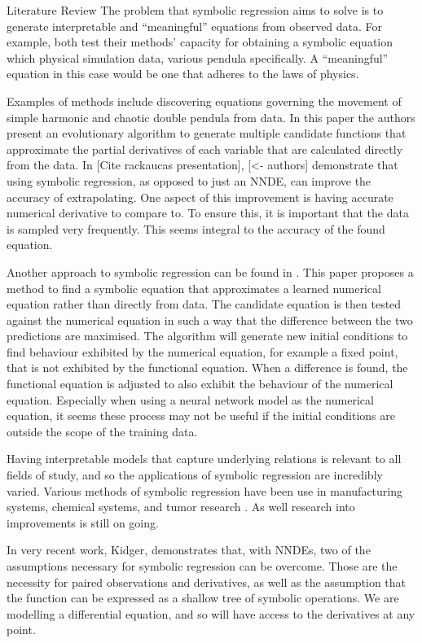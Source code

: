 \documentclass[12pt]{amsart}
\begin{document}
\begin{section}{Literature Review}
        The problem that symbolic regression aims to solve is to generate interpretable and ``meaningful'' equations from observed data. For example, both \cite{schmidt2009distilling,bongard2007automated} test their methods' capacity for obtaining a symbolic equation which physical simulation data, various pendula specifically. A ``meaningful'' equation in this case would be one that adheres to the laws of physics.


        Examples of methods include discovering equations governing the movement of simple harmonic and chaotic double pendula from data\cite{schmidt2009distilling}. In this paper the authors present an evolutionary algorithm to generate multiple candidate functions that approximate the partial derivatives of each variable that are calculated directly from the data. In [Cite rackaucas presentation], [<- authors] demonstrate that using symbolic regression, as opposed to just an NNDE, can improve the accuracy of extrapolating. One aspect of this improvement is having accurate numerical derivative to compare to. To ensure this, it is important that the data is sampled very frequently. This seems integral to the accuracy of the found equation. 
        
        Another approach to symbolic regression can be found in \cite{bongard2007automated}. This paper proposes a method to find a symbolic equation that approximates a learned numerical equation rather than directly from data. The candidate equation is then tested against the numerical equation in such a way that the difference between the two predictions are maximised. The algorithm will generate new initial conditions to find behaviour exhibited by the numerical equation, for example a fixed point, that is not exhibited by the functional equation. When a difference is found, the functional equation is adjusted to also exhibit the behaviour of the numerical equation. Especially when using a neural network model as the numerical equation, it seems these process may not be useful if the initial conditions are outside the scope of the training data.

        Having interpretable models that capture underlying relations is relevant to all fields of study, and so the applications of symbolic regression are incredibly varied. Various methods of symbolic regression have been use in manufacturing systems, chemical systems, and tumor research \cite{can2011comparison,keith2021combining,yoshihara2013inferring}. As well research into improvements is still on going.

        In very recent work, Kidger\cite{kidger2022neural}, demonstrates that, with NNDEs, two of the assumptions necessary for symbolic regression can be overcome. Those are the necessity for paired observations and derivatives, as well as the assumption that the function can be expressed as a shallow tree of symbolic operations. We are modelling a differential equation, and so will have access to the derivatives at any point. 
\end{section}
    \printbibliography
\end{document}
